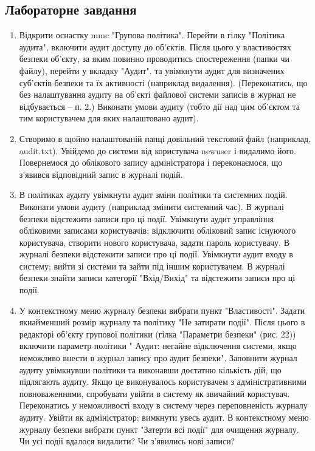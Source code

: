 \documentclass[oneside,14pt]{extarticle}
\begin{document}
\begin{normalsize}
    \section*{Лабораторне завдання}
	\begin{enumerate}
		\item Відкрити оснастку mmc "Групова політика". Перейти в гілку
		"Політика аудита", включити аудит доступу до об’єктів. Після цього у
		властивостях безпеки об’єкту, за яким повинно проводитись спостереження
		(папки чи файлу), перейти у вкладку "Аудит". та увімкнути аудит для визначених
		суб’єктів безпеки та їх активності (наприклад видалення). (Переконатись, що без
		налаштування аудиту на об’єкті файлової системи записів в журнал не
		відбувається – п. 2.) Виконати умови аудиту (тобто дії над цим об’єктом та тим
		користувачем для яких налаштовано аудит).
		\item Створимо в щойно налаштованій папці довільний текстовий файл
		(наприклад, audit.txt). Увійдемо до системи від користувача newuser і видалимо
		його. Повернемося до облікового запису адміністратора і переконаємося, що
		з’явився відповідний запис в журналі подій.
		\item В політиках аудиту увімкнути аудит зміни політики та системних
		подій. Виконати умови аудиту (наприклад змінити системний час). В журналі
		безпеки відстежити записи про ці події. Увімкнути аудит управління обліковими
		записами користувачів; відключити обліковий запис існуючого користувача,
		створити нового користувача, задати пароль користувачу. В журналі безпеки
		відстежити записи про ці події. Увімкнути аудит входу в систему; вийти зі
		системи та зайти під іншим користувачем. В журналі безпеки знайти записи
		категорії "Вхід/Вихід" та відстежити записи про ці події.
		\item У контекстному меню журналу безпеки вибрати пункт
		"Властивості". Задати якнайменший розмір журналу та політику "Не затирати
		події". Після цього в редакторі об’єкту групової політики (гілка "Параметри
		безпеки" (рис. 22)) включити параметр політики " Аудит: негайне відключення
		системи, якщо неможливо внести в журнал запису про аудит безпеки".
		Заповнити журнал аудиту увімкнувши політики та виконавши достатню
		кількість дій, що підлягають аудиту. Якщо це виконувалось користувачем з
		адміністративними повноваженнями, спробувати увійти в систему як звичайний
		користувач. Переконатись у неможливості входу в систему через переповненість
		журналу аудиту. Увійти як адміністратор; вимкнути увесь аудит. В контекстному
		меню журналу безпеки вибрати пункт "Затерти всі події" для очищення журналу.
		Чи усі події вдалося видалити? Чи з’явились нові записи?
	\end{enumerate}


\end{normalsize}
\end{document}

